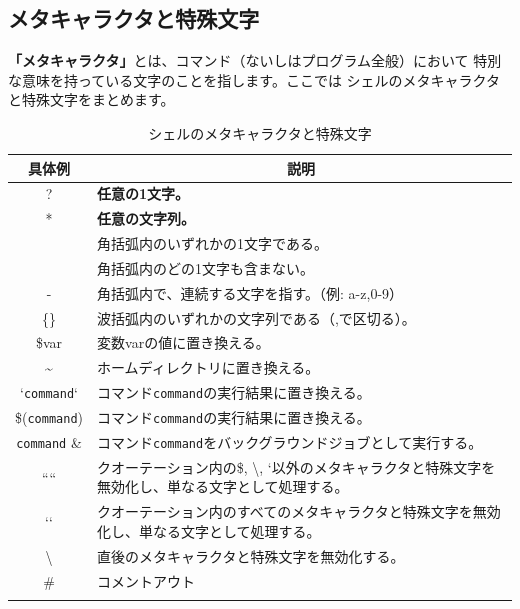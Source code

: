 \documentclass[a4j]{ltjreport}
\begin{document}
    \subsection{メタキャラクタと特殊文字}
    \textbf{「メタキャラクタ」}とは、コマンド（ないしはプログラム全般）において
    特別な意味を持っている文字のことを指します。ここでは
    シェルのメタキャラクタと特殊文字をまとめます。
    \begin{longtable}[c]{|c|l|}
        \hline
        \multicolumn{1}{|c|}{\textbf{具体例}}&\multicolumn{1}{|c|}{\textbf{説明}}\\
        \hline\hline
        ? & \textbf{任意の1文字。}\\
        \hline
        * & \textbf{任意の文字列。}\\
        \hline
        [\quad]  & 角括弧内のいずれかの1文字である。\\
        \hline
        [!\quad] & 角括弧内のどの1文字も含まない。\\
        \hline
        - & 角括弧内で、連続する文字を指す。（例: a-z,0-9）\\
        \hline
        \{\quad\} & 波括弧内のいずれかの文字列である（,で区切る）。\\
        \hline\hline
        \$var & 変数varの値に置き換える。\\
        \hline
        \textasciitilde &ホームディレクトリに置き換える。\\
        \hline
        `\texttt{command}` & コマンド\texttt{command}の実行結果に置き換える。\\
        \hline
        \$(\texttt{command}) & コマンド\texttt{command}の実行結果に置き換える。\\
        \hline
        \texttt{command} \& & コマンド\texttt{command}をバックグラウンドジョブとして実行する。\\
        \hline
        “\quad“ & クオーテーション内の\$, \textbackslash, `以外のメタキャラクタと特殊文字を無効化し、単なる文字として処理する。\\
        \hline
        ‘\quad‘ & クオーテーション内のすべてのメタキャラクタと特殊文字を無効化し、単なる文字として処理する。\\
        \hline
        \textbackslash & 直後のメタキャラクタと特殊文字を無効化する。\\
        \hline
        \# & コメントアウト\\
        \hline
        \caption{シェルのメタキャラクタと特殊文字}
    \end{longtable}
    
\end{document}
